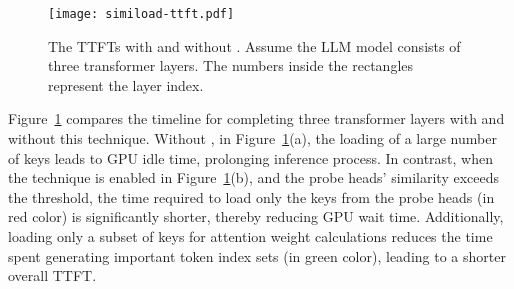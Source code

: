 %

\begin{figure}
	\centering
	\texttt{[image: simiload-ttft.pdf]}
	\caption{The TTFTs with and without \techa{}. Assume the LLM model consists of three transformer layers. The numbers inside the rectangles represent the layer index.}
	\label{fig:simiload-ttft}
\end{figure}


Figure~\ref{fig:simiload-ttft} compares the timeline for completing three transformer layers with and without this technique. 
Without \techa{}, in Figure~\ref{fig:simiload-ttft}(a), the loading of a large number of keys leads to GPU idle time, prolonging inference process. In contrast, when the technique is enabled in Figure~\ref{fig:simiload-ttft}(b), and the probe heads’ similarity exceeds the threshold, the time required to load only the keys from the probe heads (in red color) is significantly shorter, thereby reducing GPU wait time. Additionally, loading only a subset of keys for attention weight calculations reduces the time spent generating important token index sets (in green color), leading to a shorter overall TTFT.

